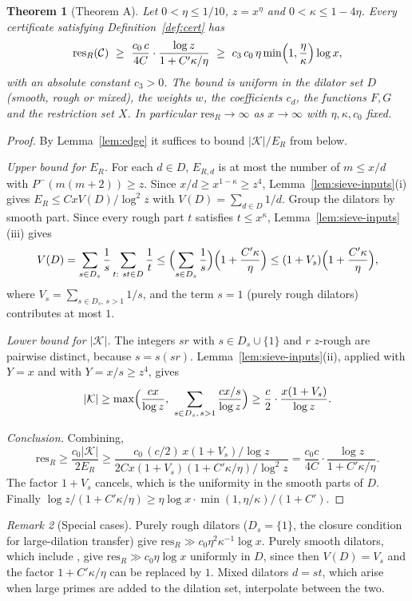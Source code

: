 \documentclass[11pt]{amsart}
\newtheorem{theorem}{Theorem}[section]
\theoremstyle{definition}
\theoremstyle{remark}
\newtheorem{remark}[theorem]{Remark}
\newcommand{\res}{\mathrm{res}}
\begin{document}
\begin{theorem}[Theorem A]\label{thm:C}
Let $0<\eta\le1/10$, $z=x^\eta$ and $0<\kappa\le1-4\eta$. Every certificate satisfying Definition~\ref{def:cert} has
\[
\res_R(\mathcal C)\ \ge\ \frac{c_0\,c}{4C}\cdot\frac{\log z}{1+C'\kappa/\eta}\ \ge\ c_3\,c_0\,\eta\min\Bigl(1,\frac\eta\kappa\Bigr)\log x,
\]
with an absolute constant $c_3>0$. The bound is uniform in the dilator set $D$ (smooth, rough or mixed), the weights $w$, the coefficients $c_d$, the functions $F,G$ and the restriction set $X$. In particular $\res_R\to\infty$ as $x\to\infty$ with $\eta,\kappa,c_0$ fixed.
\end{theorem}
\begin{proof}
By Lemma~\ref{lem:edge} it suffices to bound $|\mathcal K|/E_R$ from below.

\emph{Upper bound for $E_R$.} For each $d\in D$, $E_{R,d}$ is at most the number of $m\le x/d$ with $P^-(m(m+2))\ge z$. Since $x/d\ge x^{1-\kappa}\ge z^4$, Lemma~\ref{lem:sieve-inputs}(i) gives $E_R\le CxV(D)/\log^2z$ with $V(D)=\sum_{d\in D}1/d$. Group the dilators by smooth part. Since every rough part $t$ satisfies $t\le x^\kappa$, Lemma~\ref{lem:sieve-inputs}(iii) gives
\[
V(D)=\sum_{s\in D_s}\frac1s\sum_{\substack{t:\ st\in D}}\frac1t\le\Bigl(\sum_{s\in D_s}\frac1s\Bigr)\Bigl(1+\frac{C'\kappa}{\eta}\Bigr)\le(1+V_s)\Bigl(1+\frac{C'\kappa}{\eta}\Bigr),
\]
where $V_s=\sum_{s\in D_s,\,s>1}1/s$, and the term $s=1$ (purely rough dilators) contributes at most $1$.

\emph{Lower bound for $|\mathcal K|$.} The integers $sr$ with $s\in D_s\cup\{1\}$ and $r$ $z$-rough are pairwise distinct, because $s=s(sr)$. Lemma~\ref{lem:sieve-inputs}(ii), applied with $Y=x$ and with $Y=x/s\ge z^4$, gives
\[
|\mathcal K|\ge\max\Bigl(\frac{cx}{\log z},\ \sum_{s\in D_s,\,s>1}\frac{cx/s}{\log z}\Bigr)\ge\frac{c}{2}\cdot\frac{x(1+V_s)}{\log z}.
\]

\emph{Conclusion.} Combining,
\[
\res_R\ge\frac{c_0|\mathcal K|}{2E_R}\ge\frac{c_0\,(c/2)\,x(1+V_s)/\log z}{2Cx(1+V_s)(1+C'\kappa/\eta)/\log^2z}=\frac{c_0c}{4C}\cdot\frac{\log z}{1+C'\kappa/\eta}.
\]
The factor $1+V_s$ cancels, which is the uniformity in the smooth parts of $D$. Finally $\log z/(1+C'\kappa/\eta)\ge\eta\log x\cdot\min(1,\eta/\kappa)/(1+C')$.
\end{proof}

\begin{remark}[Special cases]
Purely rough dilators ($D_s=\{1\}$, the closure condition for large-dilation transfer) give $\res_R\gg c_0\eta^2\kappa^{-1}\log x$. Purely smooth dilators, which include \cite{HR21,Pil23}, give $\res_R\gg c_0\eta\log x$ uniformly in $D$, since then $V(D)=V_s$ and the factor $1+C'\kappa/\eta$ can be replaced by $1$. Mixed dilators $d=st$, which arise when large primes are added to the dilation set, interpolate between the two.
\end{remark}
\end{document}
